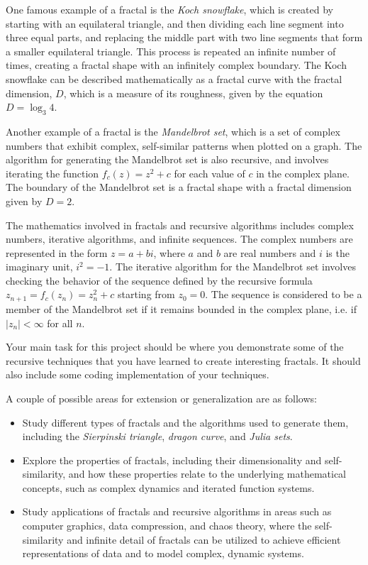\documentclass{article}
\begin{document}
    \vspace{3mm}
    One famous example of a fractal is the \textit{Koch snowflake}, which is created by starting with an equilateral triangle, and then dividing each line segment into three equal parts, and replacing the middle part with two line segments that form a smaller equilateral triangle. This process is repeated an infinite number of times, creating a fractal shape with an infinitely complex boundary. The Koch snowflake can be described mathematically as a fractal curve with the fractal dimension, $D$, which is a measure of its roughness, given by the equation $D = \log_3 4$.
    
    \vspace{3mm}
    Another example of a fractal is the \textit{Mandelbrot set}, which is a set of complex numbers that exhibit complex, self-similar patterns when plotted on a graph. The algorithm for generating the Mandelbrot set is also recursive, and involves iterating the function $f_{c}(z) = z^{2} + c$ for each value of $c$ in the complex plane. The boundary of the Mandelbrot set is a fractal shape with a fractal dimension given by $D = 2$.
    
    \vspace{3mm}
    The mathematics involved in fractals and recursive algorithms includes complex numbers, iterative algorithms, and infinite sequences. The complex numbers are represented in the form $z = a + bi$, where $a$ and $b$ are real numbers and $i$ is the imaginary unit, $i^2 = -1$. The iterative algorithm for the Mandelbrot set involves checking the behavior of the sequence defined by the recursive formula $z_{n+1} = f_{c}(z_n) = z_n^2 + c$ starting from $z_0 = 0$. The sequence is considered to be a member of the Mandelbrot set if it remains bounded in the complex plane, i.e. if $\left|z_n\right| < \infty$ for all $n$.

    \vspace{3mm}
    Your main task for this project should be where you demonstrate some of the recursive techniques that you have learned to create interesting fractals. It should also include some coding implementation of your techniques.
    
    \vspace{3mm}A couple of possible areas for extension or generalization are as follows:
    \begin{itemize}
        \item Study different types of fractals and the algorithms used to generate them, including the \textit{Sierpinski triangle}, \textit{dragon curve}, and \textit{Julia sets}.
        \item Explore the properties of fractals, including their dimensionality and self-similarity, and how these properties relate to the underlying mathematical concepts, such as complex dynamics and iterated function systems.
        \item Study applications of fractals and recursive algorithms in areas such as computer graphics, data compression, and chaos theory, where the self-similarity and infinite detail of fractals can be utilized to achieve efficient representations of data and to model complex, dynamic systems.
    \end{itemize}
\end{document}
